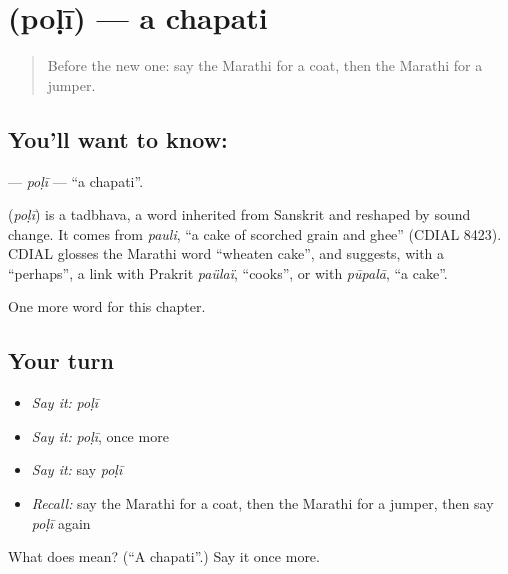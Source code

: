 \section[\texorpdfstring{\mr{पोळी} (poḷī)}{पोळी (poḷī)}]{ (poḷī) — a chapati}

\label{lesson:MR-C136-poli}



\begin{quote}
Before the new one: say the Marathi for a coat, then the Marathi for a jumper.
\end{quote}

\subsection*{You'll want to know: }
\textbf{} — \emph{poḷī} — \textquotedblleft{}a chapati\textquotedblright{}.

\begin{cousinweb}
\textbf{} (\emph{poḷī}) is a tadbhava, a word inherited from Sanskrit and reshaped by sound change. It comes from \emph{pauli}, \textquotedblleft{}a cake of scorched grain and ghee\textquotedblright{} (CDIAL 8423). CDIAL glosses the Marathi word \textquotedblleft{}wheaten cake\textquotedblright{}, and suggests, with a \textquotedblleft{}perhaps\textquotedblright{}, a link with Prakrit \emph{paülaï}, \textquotedblleft{}cooks\textquotedblright{}, or with \emph{pūpalā}, \textquotedblleft{}a cake\textquotedblright{}.
\end{cousinweb}

\begin{grammarlens}[title={What you've built}]
One more word for this chapter.
\end{grammarlens}

\subsection*{Your turn}
\begin{itemize}
\raggedright
  \item \emph{Say it:} \emph{poḷī}
  \item \emph{Say it:} \emph{poḷī}, once more
  \item \emph{Say it:} say \emph{poḷī}
  \item \emph{Recall:} say the Marathi for a coat, then the Marathi for a jumper, then say \emph{poḷī} again
\end{itemize}

\begin{tcolorbox}[breakable,colback=teal!4,colframe=teal!35!black,title={Before you move on}]
What does  mean? (\textquotedblleft{}A chapati\textquotedblright{}.) Say it once more.
\end{tcolorbox}
